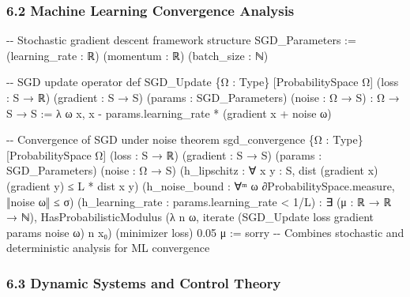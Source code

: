 \documentclass[
]{article}
\newenvironment{Shaded}{}{}
\newcommand{\NormalTok}[1]{#1}
\begin{document}
\subsubsection{6.2 Machine Learning Convergence
Analysis}\label{machine-learning-convergence-analysis}

\begin{Shaded}
\begin{Highlighting}[]
\NormalTok{{-}{-} Stochastic gradient descent framework}
\NormalTok{structure SGD\_Parameters :=}
\NormalTok{  (learning\_rate : ℝ)}
\NormalTok{  (momentum : ℝ)}
\NormalTok{  (batch\_size : ℕ)}

\NormalTok{{-}{-} SGD update operator}
\NormalTok{def SGD\_Update \{Ω : Type\} [ProbabilitySpace Ω]}
\NormalTok{  (loss : S → ℝ) (gradient : S → S) (params : SGD\_Parameters) (noise : Ω → S) : Ω → S → S :=}
\NormalTok{  λ ω x, x {-} params.learning\_rate * (gradient x + noise ω)}

\NormalTok{{-}{-} Convergence of SGD under noise}
\NormalTok{theorem sgd\_convergence}
\NormalTok{  \{Ω : Type\} [ProbabilitySpace Ω]}
\NormalTok{  (loss : S → ℝ) (gradient : S → S) (params : SGD\_Parameters) (noise : Ω → S)}
\NormalTok{  (h\_lipschitz : ∀ x y : S, dist (gradient x) (gradient y) ≤ L * dist x y)}
\NormalTok{  (h\_noise\_bound : ∀ᵐ ω ∂ProbabilitySpace.measure, ‖noise ω‖ ≤ σ)}
\NormalTok{  (h\_learning\_rate : params.learning\_rate \textless{} 1/L) :}
\NormalTok{  ∃ (μ : ℝ → ℝ → ℕ), HasProbabilisticModulus}
\NormalTok{    (λ n ω, iterate (SGD\_Update loss gradient params noise ω) n x₀)}
\NormalTok{    (minimizer loss) 0.05 μ :=}
\NormalTok{  sorry {-}{-} Combines stochastic and deterministic analysis for ML convergence}
\end{Highlighting}
\end{Shaded}

\subsubsection{6.3 Dynamic Systems and Control
Theory}\label{dynamic-systems-and-control-theory}
\end{document}
